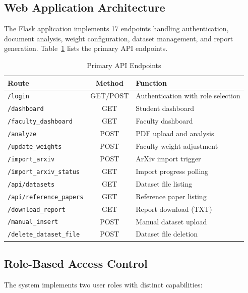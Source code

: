 \documentclass[conference]{IEEEtran}
\begin{document}
\subsection{Web Application Architecture}

The Flask application implements 17 endpoints handling authentication, document analysis, weight configuration, dataset management, and report generation. Table~\ref{tab_endpoints} lists the primary API endpoints.

\begin{table}[htbp]
\caption{Primary API Endpoints}
\begin{center}
\begin{tabular}{|p{2.8cm}|c|p{3.2cm}|}
\hline
\textbf{Route} & \textbf{Method} & \textbf{Function} \\
\hline
\texttt{/login} & GET/POST & Authentication with role selection \\
\hline
\texttt{/dashboard} & GET & Student dashboard \\
\hline
\texttt{/faculty\_dashboard} & GET & Faculty dashboard \\
\hline
\texttt{/analyze} & POST & PDF upload and analysis \\
\hline
\texttt{/update\_weights} & POST & Faculty weight adjustment \\
\hline
\texttt{/import\_arxiv} & POST & ArXiv import trigger \\
\hline
\texttt{/import\_arxiv\_status} & GET & Import progress polling \\
\hline
\texttt{/api/datasets} & GET & Dataset file listing \\
\hline
\texttt{/api/reference\_papers} & GET & Reference paper listing \\
\hline
\texttt{/download\_report} & GET & Report download (TXT) \\
\hline
\texttt{/manual\_insert} & POST & Manual dataset upload \\
\hline
\texttt{/delete\_dataset\_file} & POST & Dataset file deletion \\
\hline
\end{tabular}
\label{tab_endpoints}
\end{center}
\end{table}

\subsection{Role-Based Access Control}

The system implements two user roles with distinct capabilities:
\end{document}
